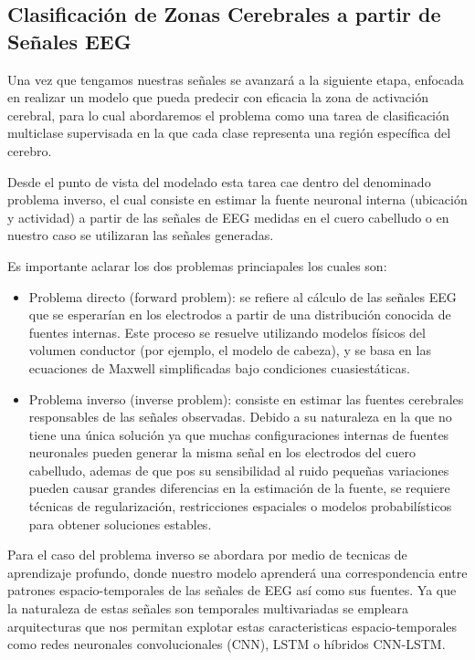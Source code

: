 \subsection{Clasificación de Zonas Cerebrales a partir de Señales EEG}
Una vez que tengamos nuestras señales se avanzará a la siguiente etapa, enfocada en realizar un modelo que pueda predecir con eficacia la zona de activación cerebral, para lo cual abordaremos el problema como una tarea de clasificación multiclase supervisada en la que cada clase representa una región específica del cerebro.

Desde el punto de vista del modelado esta tarea cae dentro del denominado problema inverso, el cual consiste en estimar la fuente neuronal interna (ubicación y actividad) a partir de las señales de EEG medidas en el cuero cabelludo o en nuestro caso se utilizaran las señales generadas.

Es importante aclarar los dos problemas princiapales los cuales son:

\begin{itemize}
    \item Problema directo (forward problem): se refiere al cálculo de las señales EEG que se esperarían en los electrodos a partir de una distribución conocida de fuentes internas. Este proceso se resuelve utilizando modelos físicos del volumen conductor (por ejemplo, el modelo de cabeza), y se basa en las ecuaciones de Maxwell simplificadas bajo condiciones cuasiestáticas.

    \item Problema inverso (inverse problem): consiste en estimar las fuentes cerebrales responsables de las señales observadas. Debido a su naturaleza en la que no tiene una única solución ya que muchas configuraciones internas de fuentes neuronales pueden generar la misma señal en los electrodos del cuero cabelludo, ademas de que pos su sensibilidad al ruido pequeñas variaciones pueden causar grandes diferencias en la estimación de la fuente, se requiere técnicas de regularización, restricciones espaciales o modelos probabilísticos para obtener soluciones estables.
\end{itemize}

Para el caso del problema inverso se abordara por medio de tecnicas de aprendizaje profundo, donde nuestro modelo aprenderá una correspondencia entre patrones espacio-temporales de las señales de EEG así como sus fuentes. Ya que la naturaleza de estas señales son temporales multivariadas se empleara arquitecturas que nos permitan explotar estas caracteristicas espacio-temporales como redes neuronales convolucionales (CNN), LSTM o híbridos CNN-LSTM.


